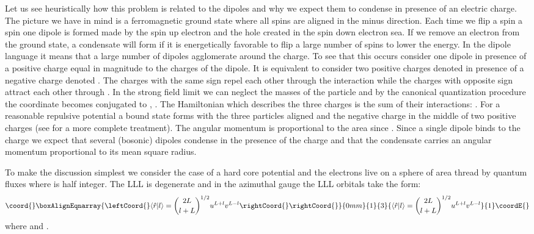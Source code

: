\documentclass[a4paper,11pt]{article}
\begin{document}
Let us see heuristically how this problem is related to the dipoles and
why we expect them to
condense in presence of an electric charge.
The picture we have in mind is a ferromagnetic ground state where all spins
are aligned in the minus direction. Each time we flip a spin a spin one
dipole is formed made by the spin up electron and the hole created in the 
spin down electron sea.
If we remove an electron from the  ground state, a condensate will
form if it is energetically favorable to flip a large number of spins to
lower the energy. In the dipole language it means that a large number of dipoles 
agglomerate around the charge. To see that this occurs
consider one dipole in presence of a positive charge equal in magnitude to the
charges of the dipole. It is equivalent to consider
two positive charges denoted \coordHE{} in presence of a negative 
charge denoted \coordHE{}. The charges with the same sign repel each other through the
interaction \coordHE{} while the charges with opposite sign attract each other through \coordHE{}. 
In the strong field limit we can neglect the masses of the particle
and by the canonical quantization procedure the coordinate \coordHE{}
becomes conjugated to \coordHE{}, \coordHE{}.
The Hamiltonian which describes the three charges is the sum of their interactions:
\coordHE{}. For a reasonable repulsive potential a
bound state forms with the three particles aligned and the negative charge
in the middle of two positive charges (see \cite{DZY} for a more complete treatment). 
The angular momentum is proportional
to the area since \coordHE{}.
Since a single dipole binds to the charge
we expect that 
several (bosonic) dipoles condense in the presence of the charge
and that the condensate carries an angular momentum \coordHE{} proportional to its mean square
radius.

To make the discussion simplest we consider the case 
of a hard core potential \coordHE{} and
the electrons live on a sphere of area \coordHE{}
thread by \coordHE{} quantum fluxes where \coordHE{} is half integer.
The LLL is \coordHE{} degenerate and in the azimuthal gauge \coordHE{} 
the LLL orbitals take the form:
\begin{eqnarray}\coord{}\boxAlignEqnarray{\leftCoord{}
\langle \hat r|l\rangle={2L \choose l+L}^{1/2} u^{L+l} v^{L-l} \rightCoord{} 
\label{FORM}
\rightCoord{}}{0mm}{1}{3}{
\langle \hat r|l\rangle={2L \choose l+L}^{1/2} u^{L+l} v^{L-l}  
}{1}\coordE{}\end{eqnarray}
\coordHE{} where \coordHE{} and 
\coordHE{}.
\end{document}
